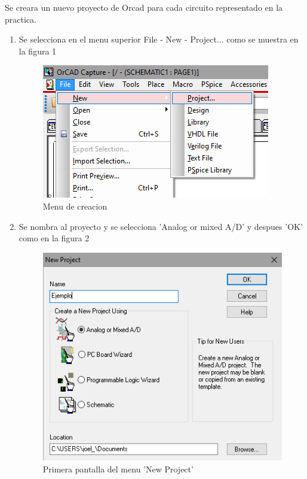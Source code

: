 ﻿\documentclass[letterpaper]{article}
\begin{document}
         
    \begin{large}
        Se creara un nuevo proyecto de Orcad para cada circuito representado en la practica.
        \begin{enumerate}
            \item Se selecciona en el menu superior File - New - Project... como se muestra en la figura 1\\
            \begin{figure}[htb]
                \centering
                \includegraphics[scale=1]{p1.png}
                \caption{Menu de creacion}
                \label{fig:Menu Creacion}
            \end{figure}
            \item Se nombra al proyecto y se selecciona 'Analog or mixed A/D' y despues 'OK' como en la figura 2\\ \newpage
            \begin{figure}[htb]
                \centering
                \includegraphics[scale=0.5]{p2.png}
                \caption{Primera pantalla del menu 'New Project'}

\end{figure}
\end{enumerate}
\end{large}
\end{document}
